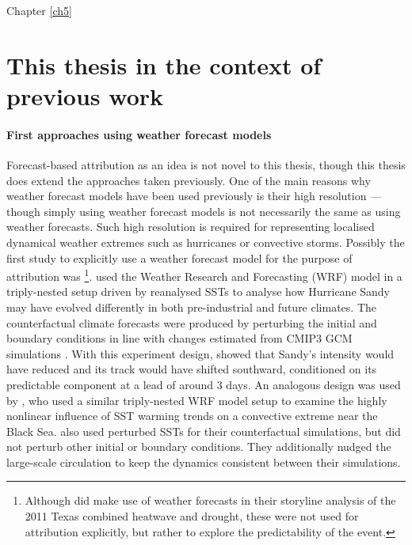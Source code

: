   Chapter \ref{ch5}

\section{This thesis in the context of previous work}

  \paragraph*{First approaches using weather forecast models}

    Forecast-based attribution as an idea is not novel to this thesis, though this thesis does extend the approaches taken previously. One of the main reasons why weather forecast models have been used previously is their high resolution --- though simply using weather forecast models is not necessarily the same as using weather forecasts. Such high resolution is required for representing localised dynamical weather extremes such as hurricanes or convective storms. Possibly the first study to explicitly use a weather forecast model for the purpose of attribution was \citet{lackmann_hurricane_2015} \footnote{Although \citet{hoerling_anatomy_2013} did make use of weather forecasts in their storyline analysis of the 2011 Texas combined heatwave and drought, these were not used for attribution explicitly, but rather to explore the predictability of the event.}. \citeauthor[]{lackmann_hurricane_2015} used the Weather Research and Forecasting (WRF) model \citep{skamarock_description_2005} in a triply-nested setup driven by reanalysed SSTs to analyse how Hurricane Sandy may have evolved differently in both pre-industrial and future climates. The counterfactual climate forecasts were produced by perturbing the initial and boundary conditions in line with changes estimated from CMIP3 GCM simulations \citep{meehl_wcrp_2007}. With this experiment design, \citeauthor{lackmann_hurricane_2015} showed that Sandy's intensity would have reduced and its track would have shifted southward, conditioned on its predictable component at a lead of around 3 days. An analogous design was used by \citet{meredith_crucial_2015}, who used a similar triply-nested WRF model setup to examine the highly nonlinear influence of SST warming trends on a convective extreme near the Black Sea. \citeauthor{meredith_crucial_2015} also used perturbed SSTs for their counterfactual simulations, but did not perturb other initial or boundary conditions. They additionally nudged the large-scale circulation to keep the dynamics consistent between their simulations. 

